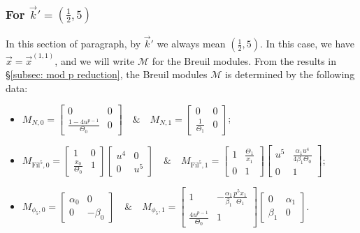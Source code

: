 \documentclass[11pt]{amsart}
\theoremstyle{definition}
\numberwithin{equation}{subsection}
\theoremstyle{plain}
\theoremstyle{plain}
\theoremstyle{plain}
\theoremstyle{plain}
\theoremstyle{plain}
\theoremstyle{plain}
\theoremstyle{plain}
\theoremstyle{plain}
\theoremstyle{plain}
\theoremstyle{plain}
\theoremstyle{plain}
\theoremstyle{plain}
\theoremstyle{definition}
\theoremstyle{definition}
\theoremstyle{definition}
\theoremstyle{remark}
\renewcommand{\(}{\textup{(}}
\renewcommand{\)}{\textup{)}}
\newcommand{\cM}{\mathcal{M}}
\newcommand{\Fil}{\mathrm{Fil}}
\newcommand{\vx}{\vec{x}}
\newcommand{\vk}{\vec{k}}
\begin{document}
\subsubsection{\textbf{For $\vk'=(\frac{1}{2},5)$}}\label{subsubsec: vr=(1,5), vk=(1/2,5)}
In this section of paragraph, by $\vk'$ we always mean $(\frac{1}{2},5)$. In this case, we have $\vx=\vx^{(1,1)}$, and we will write $\cM$ for the Breuil modules. From the results in \S\ref{subsec: mod p reduction}, the Breuil modules $\cM$ is determined by the following data:
\begin{itemize}[leftmargin=*]
  \item $M_{N,0}=
  \begin{bmatrix}
    0 & 0 \\
    \frac{1-4u^{p-1}}{\Theta_0} & 0
  \end{bmatrix}\quad\&\quad
  M_{N,1}=
  \begin{bmatrix}
    0 & 0 \\
    \frac{1}{\Theta_1} & 0
  \end{bmatrix}$;
  \item $M_{\Fil^5,0}=
  \begin{bmatrix}
    1 & 0 \\
    \frac{x_0}{\Theta_0} & 1
  \end{bmatrix}
  \begin{bmatrix}
    u^4 & 0 \\
    0 & u^5
  \end{bmatrix}\quad\&\quad
   M_{\Fil^5,1}=
  \begin{bmatrix}
    1 & \frac{\Theta_1}{x_1} \\
    0 & 1
  \end{bmatrix}
  \begin{bmatrix}
    u^5 & \frac{\alpha_1u^4}{4\beta_1\Theta_0} \\
    0 & 1
  \end{bmatrix}$;
  \item $M_{\phi_5,0}=
  \begin{bmatrix}
    \alpha_0 & 0 \\
    0 & -\beta_0
  \end{bmatrix}\quad\&\quad
  M_{\phi_5,1}=
  \begin{bmatrix}
    1 & -\frac{\alpha_1}{\beta_1}\frac{p^5x_1}{\Theta_1} \\
    \frac{4u^{p-1}}{\Theta_0} & 1
  \end{bmatrix}
  \begin{bmatrix}
    0 & \alpha_1 \\
    \beta_1 & 0
  \end{bmatrix}.$
\end{itemize}
\end{document}
